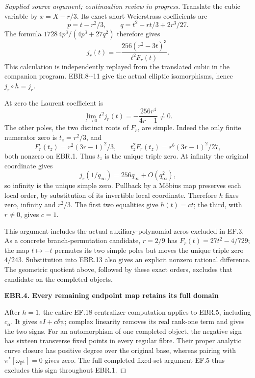 \begin{proof}[Supplied source argument; continuation review in progress]
\par\nobreak

Translate the cubic variable by \(x=X-r/3\). Its exact short
Weierstrass coefficients are
\[
 p=t-r^2/3,\qquad q=t^2-rt/3+2r^3/27.
 \tag{EBR.12}
\]
The formula \(1728\,4p^3/(4p^3+27q^2)\) therefore gives
\[
 j_r(t)=
 -\frac{256(r^2-3t)^3}{t^2F_r(t)}.
 \tag{EBR.13}
\]
This calculation is independently replayed from the translated
cubic in the companion program. EBR.8-\/-11 give the actual
elliptic isomorphisms, hence \(j_r\circ h=j_r\).

At zero the Laurent coefficient is
\[
 \lim_{t\to0}t^2j_r(t)=-\frac{256r^4}{4r-1}\ne0.
 \tag{EBR.14}
\]
The other poles, the two distinct roots of \(F_r\), are simple.
Indeed the only finite numerator zero is \(t_z=r^2/3\), and
\[
 F_r(t_z)=r^2(3r-1)^2/3,\qquad
 t_z^2F_r(t_z)=r^6(3r-1)^2/27,
 \tag{EBR.15}
\]
both nonzero on EBR.1. Thus \(t_z\) is the unique triple zero.
At infinity the original coordinate gives
\[
 j_r(1/q_\infty)=256q_\infty+O(q_\infty^2),
 \tag{EBR.16}
\]
so infinity is the unique simple zero. Pullback by a Möbius map
preserves each local order, by substitution of its invertible
local coordinate. Therefore \(h\) fixes zero, infinity and
\(r^2/3\). The first two equalities give \(h(t)=ct\); the
third, with \(r\ne0\), gives \(c=1\).

This argument includes the actual auxiliary-polynomial zeros
excluded in EF.3. As a concrete branch-permutation candidate,
\(r=2/9\) has \(F_r(t)=27t^2-4/729\); the map \(t\mapsto-t\)
permutes its two simple poles but moves the unique triple zero
\(4/243\). Substitution into EBR.13 also gives an explicit
nonzero rational difference. The geometric quotient above,
followed by these exact orders, excludes that candidate on the
completed objects.

\par

\medskip\noindent\textbf{EBR.4. Every remaining endpoint map retains its full domain}

\par\nobreak

After \(h=1\), the entire EF.18 centralizer computation applies
to EBR.5, including \(c_\alpha\). It gives
\(eI+c\delta\psi\); complex linearity removes its real rank-one
term and gives the two signs. For an automorphism of one completed
object, the negative sign has sixteen transverse fixed points in
every regular fibre. Their proper analytic curve closure has
positive degree over the original base, whereas pairing with
\(\pi^*[\omega_{\mathbb P^1}]=0\) gives zero. The full completed
fixed-set argument EF.5 thus excludes this sign throughout EBR.1.


\end{proof}
